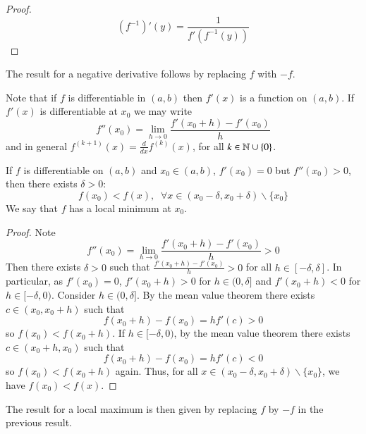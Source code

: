 \begin{subappendices}
\begin{proof}
\begin{equation*}
            (f^{-1})'(y) = \frac{1}{f'(f^{-1}(y))}
        \end{equation*}
    \end{proof}

    The result for a negative derivative follows by replacing $f$ with $-f$.

    Note that if $f$ is differentiable in $(a,b)$ then $f'(x)$ is a function on $(a,b)$. If $f'(x)$ is differentiable at $x_0$ we may write \begin{equation*}
        f''(x_0) = \lim\limits_{h\rightarrow 0}\frac{f'(x_0+h)-f'(x_0)}{h}
    \end{equation*}
    and in general $f^{(k+1)}(x) = \frac{d}{dx}f^{(k)}(x)$, for all $k \in \mathbb N\cup\{0\}$.

    \begin{prop}\label{prop:4.1.4}
        If $f$ is differentiable on $(a,b)$ and $x_0 \in (a,b)$, $f'(x_0) = 0$ but $f''(x_0) > 0$, then there exists $\delta > 0$: $$f(x_0) < f(x),\;\;\forall x \in (x_0-\delta,x_0+\delta)\backslash \{x_0\}$$ We say that $f$ has a local minimum at $x_0$.
    \end{prop}
    \begin{proof}
        Note $$f''(x_0) = \lim\limits_{h\rightarrow 0}\frac{f'(x_0+h) - f'(x_0)}{h} > 0$$ Then there exists $\delta >0$ such that $\frac{f'(x_0+h) - f'(x_0)}{h} > 0$ for all $h \in [-\delta,\delta]$. In particular, as $f'(x_0) = 0$, $f'(x_0+h) > 0$ for $h \in (0,\delta]$ and $f'(x_0+h) < 0$ for $h \in [-\delta, 0)$. Consider $h \in (0,\delta]$. By the mean value theorem there exists $c \in (x_0,x_0+h)$ such that \begin{equation*}
            f(x_0+h) - f(x_0) = hf'(c) > 0
        \end{equation*}
        so $f(x_0) < f(x_0+h)$. If $h \in [-\delta,0)$, by the mean value theorem there exists $c \in (x_0+h,x_0)$ such that \begin{equation*}
            f(x_0+h) - f(x_0) = hf'(c) < 0
        \end{equation*}
        so $f(x_0) < f(x_0+h)$ again. Thus, for all $x \in (x_0 - \delta,x_0+\delta)\backslash\{x_0\}$, we have $f(x_0) < f(x)$.
    \end{proof}

    The result for a local maximum is then given by replacing $f$ by $-f$ in the previous result.


\end{subappendices}
